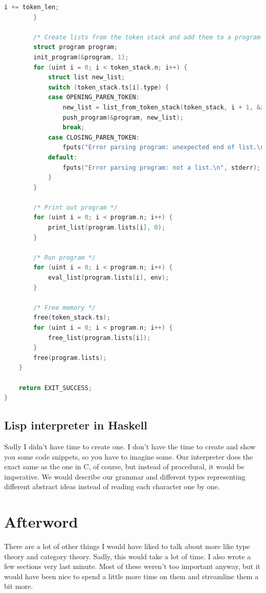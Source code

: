 \documentclass[11pt]{article}
\begin{document}
\begin{lstlisting}[language=C, basicstyle=\tiny]
            i += token_len;
        }
		
        /* Create lists from the token stack and add them to a program */
        struct program program;
        init_program(&program, 1);
        for (uint i = 0; i < token_stack.n; i++) {
            struct list new_list;
            switch (token_stack.ts[i].type) {
            case OPENING_PAREN_TOKEN:
                new_list = list_from_token_stack(token_stack, i + 1, &i);
                push_program(&program, new_list);
                break;
            case CLOSING_PAREN_TOKEN:
                fputs("Error parsing program: unexpected end of list.\n", stderr);
            default:
                fputs("Error parsing program: not a list.\n", stderr);
            }
        }

        /* Print out program */
        for (uint i = 0; i < program.n; i++) {
            print_list(program.lists[i], 0);
        }

        /* Run program */
        for (uint i = 0; i < program.n; i++) {
            eval_list(program.lists[i], env);
        }

        /* Free memory */
        free(token_stack.ts);
        for (uint i = 0; i < program.n; i++) {
            free_list(program.lists[i]);
        }
        free(program.lists);
    }

    return EXIT_SUCCESS;
}
\end{lstlisting}

\subsection{Lisp interpreter in Haskell}

Sadly I didn't have time to create one. I don't have the time to create and
show you some code snippets, so you have to imagine some. Our interpreter does
the exact same as the one in C, of course, but instead of procedural, it would
be imperative. We would describe our grammar and different types representing
different abstract ideas instead of reading each character one by one.

\newpage
\thispagestyle{empty}
\mbox{}
\newpage

\newpage
\section*{Afterword}

There are a lot of other things I would have liked to talk about more like type
theory and category theory. Sadly, this would take a lot of time. I also wrote
a few sections very last minute. Most of these weren't too important anyway,
but it would have been nice to spend a little more time on them and streamline
them a bit more.
\end{document}
